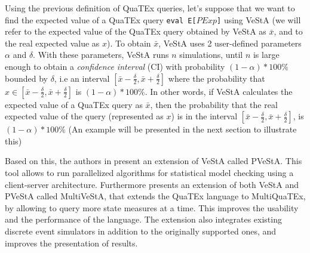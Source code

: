 Using the previous definition of QuaTEx queries, let's suppose that we want to find the expected value of a QuaTEx query \texttt{eval E[$PExp$]} using VeStA (we will refer to the expected value of the QuaTEx query obtained by VeStA as $\bar{x}$, and to the real expected value as $x$). To obtain $\bar{x}$, VeStA uses 2 user-defined parameters $\alpha$ and $\delta$. With these parameters, VeStA runs $n$ simulations, until $n$ is large enough to obtain a \textit{confidence interval} (CI) with probability $(1-\alpha) * 100\%$ bounded by $\delta$, i.e an interval $[\bar{x} - \frac{\delta}{2},\bar{x} + \frac{\delta}{2}]$ where the probability that $x \in [\bar{x} - \frac{\delta}{2},\bar{x} + \frac{\delta}{2}]$ is $(1-\alpha) * 100\%$. In other words, if VeStA calculates the expected value of a QuaTEx query as $\bar{x}$, then the probability that the real expected value of the query (represented as $x$) is in the interval $[\bar{x} - \frac{\delta}{2},\bar{x} + \frac{\delta}{2}]$, is $(1-\alpha) * 100\%$ (An example will be presented in the next section to illustrate this)

Based on this, the authors in \cite{AlTurki2011} present an extension of VeStA called PVeStA. This tool allows to run parallelized algorithms for statistical model checking using a client-server architecture. Furthermore \cite{multivesta} presents an extension of both VeStA and PVeStA called MultiVeStA, that extends the QuaTEx language to MultiQuaTEx, by allowing to query more state measures at a time. This improves the usability and the performance of the language. The extension also integrates existing discrete event simulators in addition to the originally supported ones, and improves the presentation of results. 


